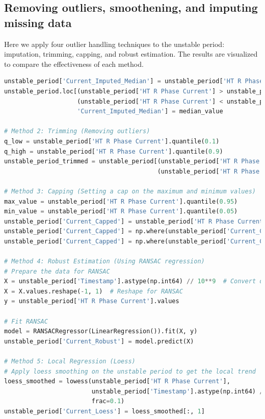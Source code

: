 \subsection{Removing outliers, smoothening, and imputing missing data}

Here we apply four outlier handling techniques to the unstable period: imputation, trimming, capping, and robust estimation. The results are visualized to compare the effectiveness of each method.

\begin{lstlisting}[language=Python, gobble=0]
unstable_period['Current_Imputed_Median'] = unstable_period['HT R Phase Current'].copy()
unstable_period.loc[(unstable_period['HT R Phase Current'] > unstable_period['HT R Phase Current'].quantile(0.95)) |
                    (unstable_period['HT R Phase Current'] < unstable_period['HT R Phase Current'].quantile(0.05)), 
                    'Current_Imputed_Median'] = median_value

# Method 2: Trimming (Removing outliers)
q_low = unstable_period['HT R Phase Current'].quantile(0.1)
q_high = unstable_period['HT R Phase Current'].quantile(0.9)
unstable_period_trimmed = unstable_period[(unstable_period['HT R Phase Current'] >= q_low) & 
                                          (unstable_period['HT R Phase Current'] <= q_high)]

# Method 3: Capping (Setting a cap on the maximum and minimum values)
max_value = unstable_period['HT R Phase Current'].quantile(0.95)
min_value = unstable_period['HT R Phase Current'].quantile(0.05)
unstable_period['Current_Capped'] = unstable_period['HT R Phase Current'].copy()
unstable_period['Current_Capped'] = np.where(unstable_period['Current_Capped'] > max_value, max_value, unstable_period['Current_Capped'])
unstable_period['Current_Capped'] = np.where(unstable_period['Current_Capped'] < min_value, min_value, unstable_period['Current_Capped'])

# Method 4: Robust Estimation (Using RANSAC regression)
# Prepare the data for RANSAC
X = unstable_period['Timestamp'].astype(np.int64) // 10**9  # Convert datetime to timestamp in seconds
X = X.values.reshape(-1, 1)  # Reshape for RANSAC
y = unstable_period['HT R Phase Current'].values

# Fit RANSAC
model = RANSACRegressor(LinearRegression()).fit(X, y)
unstable_period['Current_Robust'] = model.predict(X)

# Method 5: Local Regression (Loess)
# Apply loess smoothing on the unstable period to get the local trend
loess_smoothed = lowess(unstable_period['HT R Phase Current'], 
                        unstable_period['Timestamp'].astype(np.int64) // 10**9, 
                        frac=0.1)
unstable_period['Current_Loess'] = loess_smoothed[:, 1]
\end{lstlisting}


